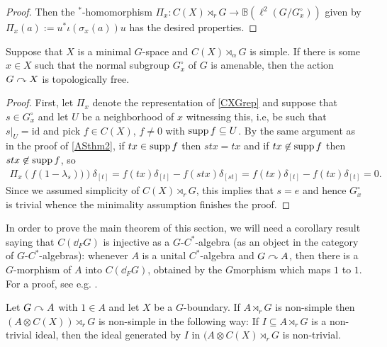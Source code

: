 \begin{proof}
Then the $^*$-homomorphism $\Pi_x \colon C(X) \rtimes_r G \to \mathbb{B}(\ell^2(G/G_x^\circ))$ given by $\Pi_x(a) := u^* \iota(\sigma_x(a)) u $ has the desired properties.
\end{proof}
\begin{proposition}
	Suppose that $X$ is a minimal $G$-space and $C(X) \rtimes_\alpha G$ is simple. If there is some $x \in X$ such that the normal subgroup $G_x^\circ$ of $G$ is amenable, then the action $G \stackrel{ }{\curvearrowright} X$ is topologically free.
\end{proposition}
\begin{proof}
	First, let $\Pi_x$ denote the representation of \cref{CXGrep} and suppose that $s \in G_x^\circ$ and let $U$ be a neighborhood of $x$ witnessing this, i.e, be such that $s|_U = \mathrm{id}$ and pick $f \in C(X)$, $f \neq 0$ with $\operatorname{supp} f \subseteq U$. By the same argument as in the proof of \cref{ASthm2}, if $tx \in \operatorname{supp} f$ then $stx=tx$ and if $tx \not \in \operatorname{supp} f$ then $stx \not \in \operatorname{supp} f$, so
	\begin{align*}
		\Pi_x\left(f ( 1-\lambda_s)) \right) \delta_{[t]} = f(tx) \delta_{[t]} -f(stx) \delta_{[st]} = f(tx) \delta_{[t]} - f(tx)\delta_{[t]} = 0.
	\end{align*}
	Since we assumed simplicity of $C(X) \rtimes_r G$, this implies that $s = e$ and hence $G_x^\circ $ is trivial whence the minimality assumption finishes the proof.
\end{proof}
\begin{note}
	In order to prove the main theorem of this section, we will need a corollary result saying that $C(\dd _F G)$ is injective as a $G$-$C^*$-algebra (as an object in the category of $G$-$C^*$-algebras): whenever $A$ is a unital $C^*$-algebra and $G \stackrel{}{\curvearrowright} A$, then there is a $G$-morphism of $A$ into $C(\dd_F G)$, obtained by the $G$morphism which maps $1$ to $1$. For a proof, see e.g. \cite[Theorem 6 + Corollary 7]{ozawa2014lecture}.
\end{note}
\begin{proposition}
	Let $G \stackrel{}{\curvearrowright} A$ with $1 \in A$ and let $X$ be a $G$-boundary. If $A \rtimes_r G$ is non-simple then $(A \otimes C(X))\rtimes_r G$ is non-simple in the following way: If $I \subseteq A \rtimes_r G$ is a non-trivial ideal, then the ideal generated by $I$ in $(A \otimes C(X)\rtimes_r G$ is non-trivial.
\end{proposition}

